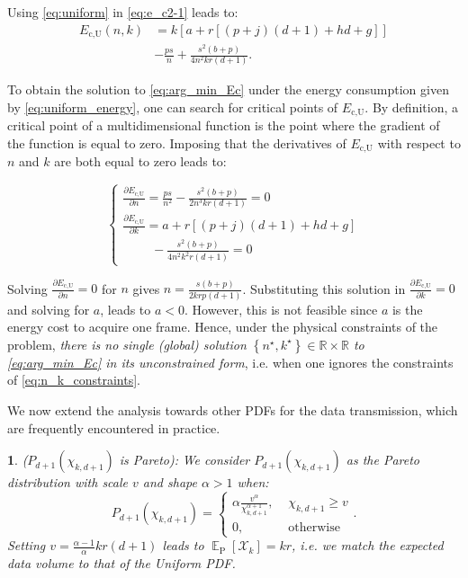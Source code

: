 \documentclass[twocolumn,english]{IEEEtran}
\theoremstyle{plain}
\theoremstyle{definition}
\newtheorem{defn}[thm]{\protect\definitionname}
\newcommand{\E}{\mathop{\mathbb E}}
\providecommand{\definitionname}{Definition}
\providecommand{\definitionname}{Definition}
\begin{document}
\begin{IEEEproof}
Using \eqref{eq:uniform} in \eqref{eq:e_c2-1} leads to: 
\begin{align}
E_{\text{c,U}}(n,k) & =k\left[a+r\left[(p+j)(d+1)+hd+g\right]\right]\label{eq:uniform_energy}\\
 & -\frac{ps}{n}+\frac{s^{2}(b+p)}{4n^{2}kr(d+1)}.\nonumber 
\end{align}


To obtain the solution to \eqref{eq:arg_min_Ec} under the energy
consumption given by \eqref{eq:uniform_energy}, one can search for
critical points of $E_{\text{c,U}}$. By definition, a critical point
of a multidimensional function is the point where the gradient of
the function is equal to zero. Imposing that the derivatives of $E_{\text{c,U}}$
with respect to $n$ and $k$ are both equal to zero leads to:

\begin{equation}
\left\{ \begin{array}{l}
\frac{\partial E_{\text{c,U}}}{\partial n}=\frac{ps}{n^{2}}-\frac{s^{2}(b+p)}{2n^{3}kr(d+1)}=0\\
\frac{\partial E_{\text{c,U}}}{\partial k}=a+r\left[(p+j)(d+1)+hd+g\right]\\
\qquad\;-\frac{s^{2}(b+p)}{4n^{2}k^{2}r(d+1)}=0
\end{array}\right.\label{eq:gradient_zero}
\end{equation}


Solving $\frac{\partial E_{\text{c,U}}}{\partial n}=0$ for $n$ gives
$n=\frac{s\left(b+p\right)}{2krp\left(d+1\right)}$. Substituting
this solution in $\frac{\partial E_{\text{c,U}}}{\partial k}=0$ and
solving for $a$, leads to $a<0$. However, this is not feasible since
$a$ is the energy cost to acquire one frame. Hence, under the physical
constraints of the problem, \emph{there is no single (global) solution
$\left\{ n^{\star},k^{\star}\right\} \in\mathcal{\mathbb{R\times R}}$
to \eqref{eq:arg_min_Ec} in its unconstrained form}, i.e. when one
ignores the constraints of \eqref{eq:n_k_constraints}. 
\end{IEEEproof}
We now extend the analysis towards other PDFs for the data transmission,
which are frequently encountered in practice. 
\begin{defn}
\emph{($P_{d+1}(\chi_{k,d+1})$ is Pareto):} \emph{We consider $P_{d+1}(\chi_{k,d+1})$
as the Pareto distribution with scale $v$ and shape $\alpha>1$ when:
\begin{equation}
P_{d+1}(\chi_{k,d+1})=\begin{cases}
\alpha\frac{v^{\alpha}}{\chi_{k,d+1}^{\alpha+1}}, & \,\,\chi_{k,d+1}\ge v\\
0, & \,\,\text{otherwise}
\end{cases}.\label{eq:Pareto}
\end{equation}
Setting $v=\frac{\alpha-1}{\alpha}kr(d+1)$ leads to} $\E_{\text{P}}[\mathcal{X}_{k}]=kr$\emph{,
i.e. we match the expected data volume to that of the Uniform PDF.} 
\end{defn}
\end{document}
